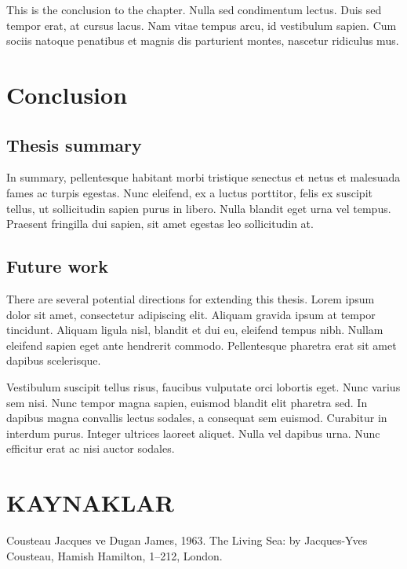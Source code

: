 \documentclass[12pt,turkish,a4paperpaper,]{report}
\begin{document}
This is the conclusion to the chapter. Nulla sed condimentum lectus.
Duis sed tempor erat, at cursus lacus. Nam vitae tempus arcu, id
vestibulum sapien. Cum sociis natoque penatibus et magnis dis parturient
montes, nascetur ridiculus mus.

\hypertarget{conclusion-5}{%
\chapter{Conclusion}\label{conclusion-5}}

\thispagestyle{empty}

\hypertarget{thesis-summary}{%
\section{Thesis summary}\label{thesis-summary}}

In summary, pellentesque habitant morbi tristique senectus et netus et
malesuada fames ac turpis egestas. Nunc eleifend, ex a luctus porttitor,
felis ex suscipit tellus, ut sollicitudin sapien purus in libero. Nulla
blandit eget urna vel tempus. Praesent fringilla dui sapien, sit amet
egestas leo sollicitudin at.

\hypertarget{future-work}{%
\section{Future work}\label{future-work}}

There are several potential directions for extending this thesis. Lorem
ipsum dolor sit amet, consectetur adipiscing elit. Aliquam gravida ipsum
at tempor tincidunt. Aliquam ligula nisl, blandit et dui eu, eleifend
tempus nibh. Nullam eleifend sapien eget ante hendrerit commodo.
Pellentesque pharetra erat sit amet dapibus scelerisque.

Vestibulum suscipit tellus risus, faucibus vulputate orci lobortis eget.
Nunc varius sem nisi. Nunc tempor magna sapien, euismod blandit elit
pharetra sed. In dapibus magna convallis lectus sodales, a consequat sem
euismod. Curabitur in interdum purus. Integer ultrices laoreet aliquet.
Nulla vel dapibus urna. Nunc efficitur erat ac nisi auctor sodales.

\footnotesize

\chapter{KAYNAKLAR}

\hypertarget{refs}{}
\leavevmode\hypertarget{ref-Cousteau1963}{}%
Cousteau Jacques ve Dugan James, 1963. The Living Sea: by Jacques-Yves
Cousteau, Hamish Hamilton, 1--212, London.
\end{document}

